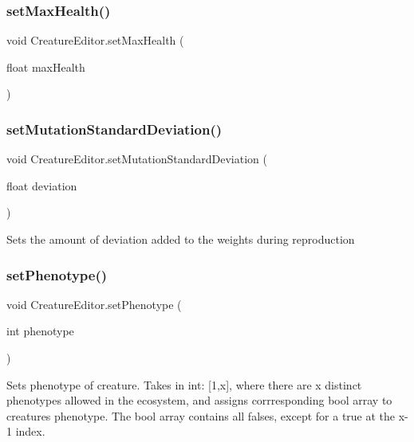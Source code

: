 \subsubsection{\texorpdfstring{set\+Max\+Health()}{setMaxHealth()}}
{\footnotesize\ttfamily void Creature\+Editor.\+set\+Max\+Health (\begin{DoxyParamCaption}\item[{float}]{max\+Health }\end{DoxyParamCaption})}

\mbox{\label{class_creature_editor_aeebb715ee7340999be80095aeb6c5c41}} 
\subsubsection{\texorpdfstring{set\+Mutation\+Standard\+Deviation()}{setMutationStandardDeviation()}}
{\footnotesize\ttfamily void Creature\+Editor.\+set\+Mutation\+Standard\+Deviation (\begin{DoxyParamCaption}\item[{float}]{deviation }\end{DoxyParamCaption})}



Sets the amount of deviation added to the weights during reproduction 

\mbox{\label{class_creature_editor_a63a9951aa74689237e12cd131cef6e0e}} 
\subsubsection{\texorpdfstring{set\+Phenotype()}{setPhenotype()}}
{\footnotesize\ttfamily void Creature\+Editor.\+set\+Phenotype (\begin{DoxyParamCaption}\item[{int}]{phenotype }\end{DoxyParamCaption})}



Sets phenotype of creature. Takes in int\+: \mbox{[}1,x\mbox{]}, where there are x distinct phenotypes allowed in the ecosystem, and assigns corrresponding bool array to creatures phenotype. The bool array contains all falses, except for a true at the x-\/1 index. 


